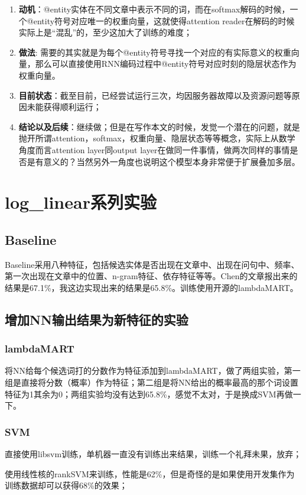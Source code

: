 \documentclass[11pt]{article}
\begin{document}
\begin{enumerate}
    \item {\bf 动机}：@entity实体在不同文章中表示不同的词，而在softmax解码的时候，一个@entity符号对应唯一的权重向量，这就使得attention reader在解码的时候实际上是“混乱”的，至少这加大了训练的难度；
    \item  {\bf 做法}: 需要的其实就是为每个@entity符号寻找一个对应的有实际意义的权重向量，那么可以直接使用RNN编码过程中@entity符号对应时刻的隐层状态作为权重向量。
    \item  {\bf  目前状态}：截至目前，已经尝试运行三次，均因服务器故障以及资源问题等原因未能获得顺利运行；
    \item  {\bf  结论以及后续}：继续做；但是在写作本文的时候，发觉一个潜在的问题，就是抛开所谓attention，softmax，权重向量、隐层状态等等概念，实际上从数学角度而言attention layer同output layer在做同一件事情，做两次同样的事情是否是有意义的？当然另外一角度也说明这个模型本身非常便于扩展叠加多层。
\end{enumerate}

\section{log\_linear系列实验}
\subsection{Baseline}
Baseline采用八种特征，包括候选实体是否出现在文章中、出现在问句中、频率、第一次出现在文章中的位置、n-gram特征、依存特征等等。Chen的文章报出来的结果是67.1\%，我这边实现出来的结果是65.8\%。训练使用开源的lambdaMART。
\subsection{增加NN输出结果为新特征的实验}
\subsubsection{lambdaMART}
将NN给每个候选词打的分数作为特征添加到lambdaMART，做了两组实验，第一组是直接将分数（概率）作为特征；第二组是将NN给出的概率最高的那个词设置特征为1其余为0；两组实验均没有达到65.8\%，感觉不太对，于是换成SVM再做一下。
\subsubsection{SVM}
直接使用libsvm训练，单机器一直没有训练出来结果，训练一个礼拜未果，放弃；

\noindent 使用线性核的rankSVM来训练，性能是62\%，但是奇怪的是如果使用开发集作为训练数据却可以获得68\%的效果；
\end{document}
